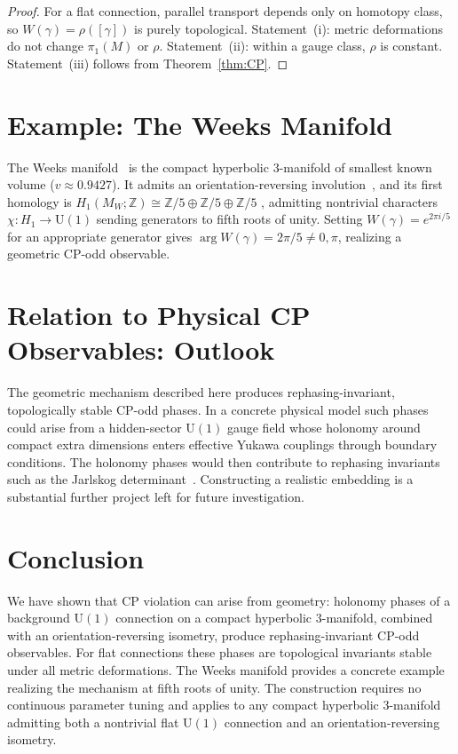 ﻿\documentclass[12pt]{article}
\theoremstyle{definition}
\theoremstyle{remark}
\newcommand{\Uone}{\mathrm{U}(1)}
\newcommand{\pione}{\pi_1}
\begin{document}
\begin{proof}
For a flat connection, parallel transport depends only on homotopy class, so
$W(\gamma)=\rho([\gamma])$ is purely topological. Statement~(i): metric
deformations do not change $\pione(M)$ or $\rho$. Statement~(ii): within a
gauge class, $\rho$ is constant. Statement~(iii) follows from Theorem~\ref{thm:CP}.
\end{proof}

\section{Example: The Weeks Manifold}

The Weeks manifold~\cite{Weeks} is the compact hyperbolic 3-manifold of
smallest known volume ($v\approx0.9427$). It admits an orientation-reversing
involution~\cite{GoodmanEtAl}, and its first homology is
$H_1(M_W;\mathbb{Z})\cong\mathbb{Z}/5\oplus\mathbb{Z}/5\oplus\mathbb{Z}/5$
\cite{SnapPy}, admitting nontrivial characters $\chi\colon H_1\to\Uone$
sending generators to fifth roots of unity. Setting
$W(\gamma)=e^{2\pi i/5}$ for an appropriate generator gives
$\arg W(\gamma)=2\pi/5\neq0,\pi$, realizing a geometric CP-odd observable.

\section{Relation to Physical CP Observables: Outlook}

The geometric mechanism described here produces rephasing-invariant,
topologically stable CP-odd phases. In a concrete physical model such phases
could arise from a hidden-sector $\Uone$ gauge field whose holonomy around
compact extra dimensions enters effective Yukawa couplings through boundary
conditions. The holonomy phases would then contribute to rephasing invariants
such as the Jarlskog determinant~\cite{Jarlskog}. Constructing a realistic
embedding is a substantial further project left for future investigation.

\section{Conclusion}

We have shown that CP violation can arise from geometry: holonomy phases of
a background $\Uone$ connection on a compact hyperbolic 3-manifold, combined
with an orientation-reversing isometry, produce rephasing-invariant CP-odd
observables. For flat connections these phases are topological invariants
stable under all metric deformations. The Weeks manifold provides a concrete
example realizing the mechanism at fifth roots of unity. The construction
requires no continuous parameter tuning and applies to any compact hyperbolic
3-manifold admitting both a nontrivial flat $\Uone$ connection and an
orientation-reversing isometry.



\end{document}

